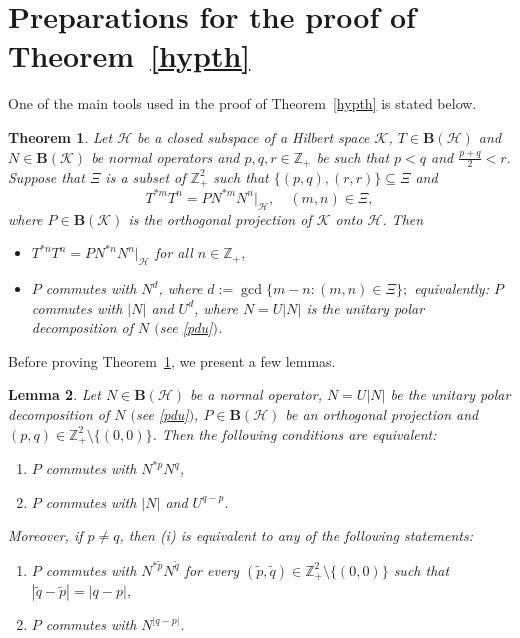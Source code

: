 \documentclass[reqno]{amsproc}
\numberwithin{equation}{section}
\newtheorem{theorem}{Theorem}[section]
\newtheorem{lemma}[theorem]{Lemma}
\theoremstyle{remark}
\newcommand*{\hh}{\mathcal{H}}
\newcommand*{\kk}{\mathcal{K}}
\newcommand*{\bou}{\boldsymbol{B}}
\theoremstyle{definition}
\newcommand*{\ogr}{\boldsymbol{B}}
\newcommand*{\zbb}{\mathbb{Z}}
\begin{document}
   \section{\label{Sec.6v}Preparations for the proof of Theorem~\ref{hypth}}
   One of the main tools used in the proof of
Theorem~\ref{hypth} is stated below.
   \begin{theorem}\label{main1}
Let $\hh$ be a closed subspace of a Hilbert space
$\kk$, $T\in \bou(\hh)$ and $N\in \ogr(\kk)$ be normal
operators and $p,q,r\in \zbb_+$ be such that $p<q$ and
$\frac{p+q}{2}<r$. Suppose that $\varXi$ is a subset
of $\zbb_+^2$ such that $\{(p,q), (r,r)\} \subseteq
\varXi$ and
   \begin{equation}  \label{pukur}
T^{*m}T^n=PN^{*m}N^n|_\hh, \quad (m,n)\in \varXi,
   \end{equation}
where $P\in \ogr(\kk)$ is the orthogonal projection of
$\kk$ onto $\hh$. Then
   \begin{itemize}
    \item[(i)] $T^{*n}T^n=PN^{*n}N^n|_\hh$ for all $n\in
\zbb_+$,
    \item[(ii)] $P$ commutes with
$N^{d}$, where $d:=\gcd \{m-n\colon (m,n)\in
\varXi\};$ equivalently{\em :} $P$ commutes with $|N|$
and $U^{d}$, where $N=U|N|$ is the unitary polar
decomposition of $N$ $($see \eqref{pdu}$)$.
   \end{itemize}
   \end{theorem}
Before proving Theorem~\ref{main1}, we present a few
lemmas.
   \begin{lemma} \label{npq}
Let $N\in \ogr(\hh)$ be a normal operator,
$N=U |N|$ be the unitary polar decomposition
of $N$ $($see \eqref{pdu}$)$, $P \in
\ogr(\hh)$ be an orthogonal projection and
$(p,q)\in \zbb_+^2 \setminus \{(0,0)\}$.
Then the following conditions are
equivalent{\em :}
   \begin{enumerate}
   \item[(i)] $P$ commutes with $N^{*p}N^q$,
   \item[(ii)] $P$ commutes with $|N|$ and
$U^{q-p}$.
   \end{enumerate}
Moreover, if $p\neq q$, then {\em (i)} is
equivalent to any of the following
statements{\em :}
   \begin{enumerate}
   \item[(iii)] $P$ commutes with
$N^{*{\tilde p}}N^{\tilde q}$ for every
$(\tilde p, \tilde q) \in \zbb_+^2 \setminus
\{(0,0)\}$ such that $|\tilde q-\tilde
p|=|q-p|$,
   \item[(iv)] $P$ commutes with $N^{|q-p|}$.
   \end{enumerate}
   \end{lemma}
\end{document}
